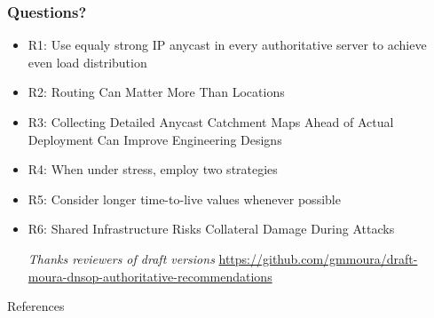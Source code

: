 \documentclass[11pt,show 
notes,notheorems,noamsthm,blank]{beamer} %
\begin{document}
\begin{frame}
 \frametitle{Questions?}
 \vspace{0.5cm}
 \begin{itemize}
  \item R1: Use equaly strong IP anycast in every authoritative server to
    achieve even load distribution~\cite{Mueller17b}
    
  \item R2:  Routing Can Matter More Than Locations~\cite{Schmidt17a}
  
  \item R3: Collecting Detailed Anycast Catchment Maps Ahead of Actual
    Deployment Can Improve Engineering Designs~\cite{Vries17b}
    
  \item R4:    When under stress, employ two strategies~\cite{Moura16b}
  
  \item R5:  Consider longer time-to-live values whenever 
possible~\cite{Moura18b}
  
    \item R6:  Shared Infrastructure Risks Collateral Damage During 
Attacks~\cite{Moura16b}
    
 \vspace{0.5cm}
 \centering \textit{Thanks  reviewers of draft versions}
 \centering \small 
\url{https://github.com/gmmoura/draft-moura-dnsop-authoritative-recommendations}
  

 \end{itemize}

\end{frame}



% 
%  
%  
% 
 
 \begin{frame}[allowframebreaks] {References}
 \small

\small

\end{frame}
 
\end{document}
